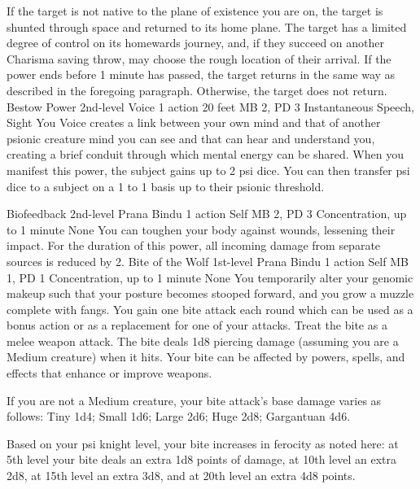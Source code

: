If the target is not native to the plane of existence you are on,
the target is shunted through space and returned to its home plane.
The target has a limited degree of control on its homewards journey,
and, if they succeed on another Charisma saving throw,
may choose the rough location of their arrival.
If the power ends before 1 minute has passed,
the target returns in the same way as described in the foregoing paragraph.
Otherwise,
the target does not return.
\DndPowerHeader%
    {Bestow Power\label{pwr:bestow_power}}
    {2nd-level Voice}
    {1 action}
    {20 feet}
    {MB 2, PD 3}
    {Instantaneous}
    {Speech, Sight}
You Voice creates a link between your own
mind and that of another psionic creature mind you can see
and that can hear and understand you,
creating a brief conduit through which mental energy can be
shared. When you manifest this power, the subject gains up
to 2 psi dice. You can then transfer psi dice to a subject
on a 1 to 1 basis up to their psionic threshold.

\DndPowerHeader%
    {Biofeedback\label{pwr:biofeedback}}
    {2nd-level Prana Bindu}
    {1 action}
    {Self}
    {MB 2, PD 3}
    {Concentration, up to 1 minute}
    {None}
You can toughen your body against wounds,
lessening their impact. For the duration of this power,
all incoming damage from separate sources is reduced by 2.
\DndPowerHeader%
    {Bite of the Wolf\label{pwr:bite_of_the_wolf}}
    {1st-level Prana Bindu}
    {1 action}
    {Self}
    {MB 1, PD 1}
    {Concentration, up to 1 minute}
    {None}
You temporarily alter your genomic makeup
such that your posture becomes stooped forward, and you grow
a muzzle complete with fangs. You gain one bite attack each
round which can be used as a bonus action or as a replacement
for one of your attacks. Treat the bite as a melee weapon
attack. The bite deals 1d8 piercing damage (assuming you are
a Medium creature) when it hits. Your bite can be affected
by powers, spells, and effects that enhance or improve weapons.

If you are not a Medium creature, your bite attack's base
damage varies as follows: Tiny 1d4; Small 1d6; Large 2d6;
Huge 2d8; Gargantuan 4d6.

Based on your psi knight level, your bite increases in ferocity
as noted here: at 5th level your bite deals an extra 1d8 points
of damage, at 10th level an extra 2d8, at 15th level an extra
3d8, and at 20th level an extra 4d8 points.

